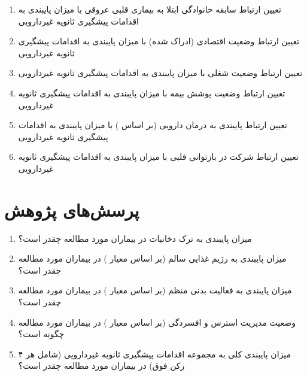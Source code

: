 \begin{enumerate}[label=\arabic*.]
\item تعیین ارتباط سابقه خانوادگی ابتلا به بیماری قلبی عروقی با میزان پایبندی به اقدامات پیشگیری ثانویه غیردارویی

\item تعیین ارتباط وضعیت اقتصادی (ادراک شده) با میزان پایبندی به اقدامات پیشگیری ثانویه غیردارویی

\item تعیین ارتباط وضعیت شغلی با میزان پایبندی به اقدامات پیشگیری ثانویه غیردارویی

\item تعیین ارتباط وضعیت پوشش بیمه با میزان پایبندی به اقدامات پیشگیری ثانویه غیردارویی

\item تعیین ارتباط پایبندی به درمان دارویی (بر اساس  ) با میزان پایبندی به اقدامات پیشگیری ثانویه غیردارویی

\item تعیین ارتباط شرکت در بازتوانی قلبی با میزان پایبندی به اقدامات پیشگیری ثانویه غیردارویی

\end{enumerate}



\section{پرسش‌های پژوهش}
\label{sec:research-questions}
\begin{enumerate}[label=\arabic*.]

\item میزان پایبندی به ترک دخانیات در بیماران مورد مطالعه چقدر است؟

\item میزان پایبندی به رژیم غذایی سالم (بر اساس معیار ) در بیماران مورد مطالعه چقدر است؟

\item میزان پایبندی به فعالیت بدنی منظم (بر اساس معیار ) در بیماران مورد مطالعه چقدر است؟

\item وضعیت مدیریت استرس و افسردگی (بر اساس معیار ) در بیماران مورد مطالعه چگونه است؟

\item میزان پایبندی کلی به مجموعه اقدامات پیشگیری ثانویه غیردارویی (شامل هر ۴ رکن فوق) در بیماران مورد مطالعه چقدر است؟

\end{enumerate}

